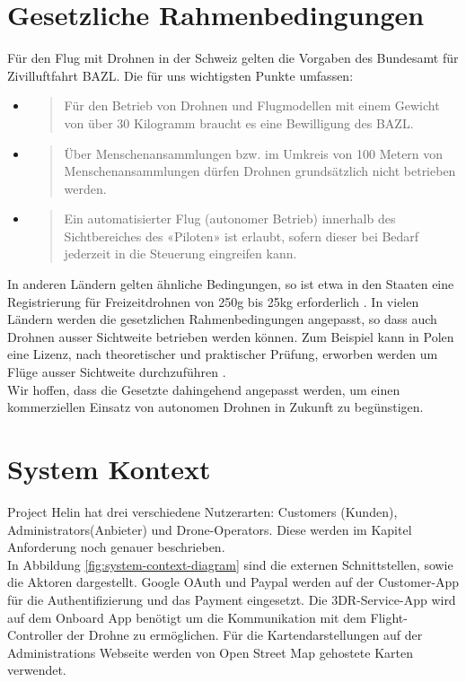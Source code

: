 \section{Gesetzliche Rahmenbedingungen}
Für den Flug mit Drohnen in der Schweiz gelten die Vorgaben des Bundesamt für Zivilluftfahrt BAZL. Die für uns wichtigsten Punkte umfassen:
\begin{itemize}
	\item{\blockquote{Für den Betrieb von Drohnen und Flugmodellen mit einem Gewicht von über 30 Kilogramm braucht es eine Bewilligung des BAZL.} \cite{drohne-bazl}}
	\item{\blockquote{Über Menschenansammlungen bzw. im Umkreis von 100 Metern von Menschenansammlungen dürfen Drohnen grundsätzlich nicht betrieben werden.} \cite{drohne-bazl}}
	\item{\blockquote{Ein automatisierter Flug (autonomer Betrieb) innerhalb des Sichtbereiches des «Piloten» ist erlaubt, sofern dieser bei Bedarf jederzeit in die Steuerung eingreifen kann.}
	\cite{drohne-bazl}}
\end{itemize}
In anderen Ländern gelten ähnliche Bedingungen, so ist etwa in den Staaten eine Registrierung für Freizeitdrohnen von 250g bis 25kg erforderlich \cite[Seite 26]{pwc-drone}. In vielen Ländern werden die gesetzlichen Rahmenbedingungen angepasst, so dass auch Drohnen ausser Sichtweite betrieben werden können. Zum Beispiel kann in Polen eine Lizenz, nach theoretischer und praktischer Prüfung, erworben werden um Flüge ausser Sichtweite durchzuführen \cite[Seite 21]{pwc-drone}.
\\
Wir hoffen, dass die Gesetzte dahingehend angepasst werden, um einen kommerziellen Einsatz von autonomen Drohnen in Zukunft zu begünstigen. 

\section{System Kontext}

Project Helin hat drei verschiedene Nutzerarten: Customers (Kunden), Administrators(Anbieter) und Drone-Operators. Diese werden im Kapitel Anforderung noch genauer beschrieben.\\

In Abbildung \ref{fig:system-context-diagram} sind die externen Schnittstellen, sowie die Aktoren dargestellt. Google OAuth und Paypal werden auf der Customer-App für die Authentifizierung und das Payment eingesetzt. Die 3DR-Service-App wird auf dem Onboard App benötigt um die Kommunikation mit dem Flight-Controller der Drohne zu ermöglichen. Für die Kartendarstellungen auf der Administrations Webseite werden von Open Street Map gehostete Karten verwendet.


